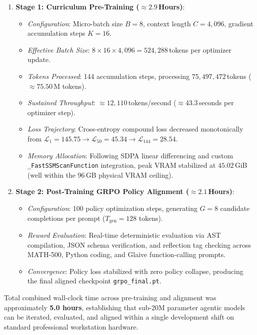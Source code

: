 \documentclass[10pt,twocolumn,letterpaper]{article}
\begin{document}
\begin{enumerate}
    \item \textbf{Stage 1: Curriculum Pre-Training ($\approx 2.9$\,Hours)}:
    \begin{itemize}
        \item \emph{Configuration}: Micro-batch size $B = 8$, context length $C = 4,096$, gradient accumulation steps $K = 16$.
        \item \emph{Effective Batch Size}: $8 \times 16 \times 4,096 = 524,288$\,tokens per optimizer update.
        \item \emph{Tokens Processed}: 144 accumulation steps, processing $75,497,472$\,tokens ($\approx 75.50$\,M tokens).
        \item \emph{Sustained Throughput}: $\approx 12,110$\,tokens/second ($\approx 43.3$\,seconds per optimizer step).
        \item \emph{Loss Trajectory}: Cross-entropy compound loss decreased monotonically from $\mathcal{L}_1 = 145.75 \to \mathcal{L}_{50} = 45.34 \to \mathcal{L}_{144} = 28.54$.
        \item \emph{Memory Allocation}: Following SDPA linear differencing and custom \texttt{\_FastSSMScanFunction} integration, peak VRAM stabilized at $45.02$\,GiB (well within the 96\,GB physical VRAM ceiling).
    \end{itemize}

    \item \textbf{Stage 2: Post-Training GRPO Policy Alignment ($\approx 2.1$\,Hours)}:
    \begin{itemize}
        \item \emph{Configuration}: 100 policy optimization steps, generating $G = 8$ candidate completions per prompt ($T_{\text{gen}} = 128$ tokens).
        \item \emph{Reward Evaluation}: Real-time deterministic evaluation via AST compilation, JSON schema verification, and reflection tag checking across MATH-500, Python coding, and Glaive function-calling prompts.
        \item \emph{Convergence}: Policy loss stabilized with zero policy collapse, producing the final aligned checkpoint \texttt{grpo\_final.pt}.
    \end{itemize}
\end{enumerate}

Total combined wall-clock time across pre-training and alignment was approximately \textbf{5.0 hours}, establishing that sub-20M parameter agentic models can be iterated, evaluated, and aligned within a single development shift on standard professional workstation hardware.
\end{document}
